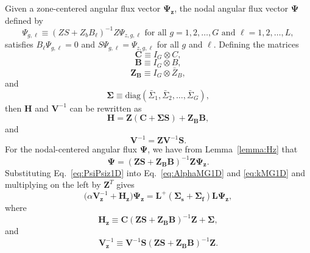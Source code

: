 Given a zone-centered angular flux vector $\mathbf{\Psi_{z}}$, the nodal angular flux vector $\mathbf{\Psi}$ defined by
\begin{equation}
	\Psi_{g,\ell} \equiv (ZS + Z_{b}B_{\ell})^{-1}Z \Psi_{z,g,\ell} \text{ for all } g = 1, 2, \dots, G \text{ and } \ell = 1, 2, \dots, L,
\end{equation}
satisfies $B_{\ell} \Psi_{g,\ell} = 0$ and $S \Psi_{g,\ell} = \Psi_{z,g,\ell}$ for all $g$ and $\ell$. Defining the matrices
\begin{equation}
	\mathbf{C} \equiv I_{G} \otimes C,
\end{equation}
\begin{equation}
	\mathbf{B} \equiv I_{G} \otimes B,
\end{equation}
\begin{equation}
	\mathbf{Z_{B}} \equiv I_{G} \otimes \bar{Z}_{B},
\end{equation}
and
\begin{equation}
	\mathbf{\Sigma} \equiv \text{diag}(\bar{\Sigma}_{1}, \bar{\Sigma}_{2}, \dots, \bar{\Sigma}_{G}),
\end{equation}
then $\mathbf{H}$ and $\mathbf{V}^{-1}$ can be rewritten as
\begin{equation}
	\mathbf{H} = \mathbf{Z}(\mathbf{C} + \mathbf{\Sigma S}) + \mathbf{Z_{B} B},
\end{equation}
and
\begin{equation}
	\mathbf{V}^{-1} = \mathbf{Z}\mathbf{V}^{-1} \mathbf{S}.
\end{equation}
For the nodal-centered angular flux $\mathbf{\Psi}$, we have from Lemma~\ref{lemma:Hz} that
\begin{equation}
	\mathbf{\Psi} = (\mathbf{ZS} + \mathbf{Z_{B}B})^{-1}\mathbf{Z}\mathbf{\Psi_{z}}.
	\label{eq:PsiPsiz1D}
\end{equation}
Substituting Eq.~\ref{eq:PsiPsiz1D} into Eq.~\ref{eq:AlphaMG1D} and \ref{eq:kMG1D} and multiplying on the left by $\mathbf{Z}^{T}$ gives
\begin{equation}
	\boxed{\big ( \alpha \mathbf{V}_\mathbf{z}^{-1} + \mathbf{H_{z}} \big ) \mathbf{\Psi_{z}} = \mathbf{L}^{+}( \mathbf{\Sigma_{s}} + \mathbf{\Sigma_{f}}) \mathbf{L} \mathbf{\Psi_{z}},}
	\label{eq:AlphaZ1D}
\end{equation}
where
\begin{equation}
	\mathbf{H_{z}} \equiv \mathbf{C}(\mathbf{ZS} + \mathbf{Z_{B}B})^{-1}\mathbf{Z} + \mathbf{\Sigma},
\end{equation}
and
\begin{equation}
	\mathbf{V}_{\mathbf{z}}^{-1} \equiv \mathbf{V}^{-1} \mathbf{S} (\mathbf{ZS} + \mathbf{Z_{B}B})^{-1}\mathbf{Z}.
\end{equation}

